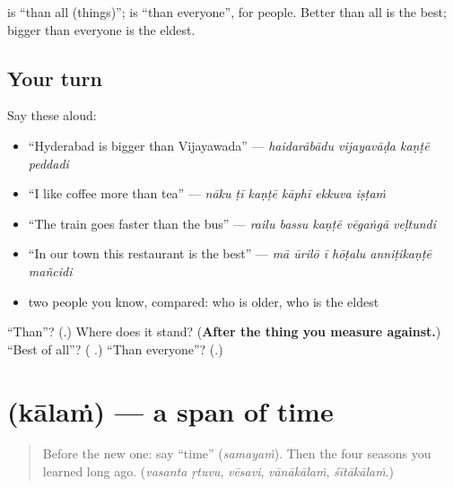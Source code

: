 \textbf{} is \textquotedblleft{}than all (things)\textquotedblright{}; \textbf{} is \textquotedblleft{}than everyone\textquotedblright{}, for people. Better than all is the best; bigger than everyone is the eldest.

\subsection*{Your turn}
Say these aloud:

\begin{itemize}
\raggedright
  \item \textquotedblleft{}Hyderabad is bigger than Vijayawada\textquotedblright{} — \emph{haidarābādu vijayavāḍa kaṇṭē peddadi}
  \item \textquotedblleft{}I like coffee more than tea\textquotedblright{} — \emph{nāku ṭī kaṇṭē kāphī ekkuva iṣṭaṁ}
  \item \textquotedblleft{}The train goes faster than the bus\textquotedblright{} — \emph{railu bassu kaṇṭē vēgaṅgā veḷtundi}
  \item \textquotedblleft{}In our town this restaurant is the best\textquotedblright{} — \emph{mā ūrilō ī hōṭalu anniṭikaṇṭē mañcidi}
  \item two people you know, compared: who is older, who is the eldest
\end{itemize}

\begin{tcolorbox}[breakable,colback=teal!4,colframe=teal!35!black,title={Before you move on}]
\textquotedblleft{}Than\textquotedblright{}? (\textbf{}.) Where does it stand? (\textbf{After the thing you measure against.}) \textquotedblleft{}Best of all\textquotedblright{}? (\textbf{ }.) \textquotedblleft{}Than everyone\textquotedblright{}? (\textbf{}.)
\end{tcolorbox}
\section[\texorpdfstring{\te{కాలం} (kālaṁ)}{కాలం (kālaṁ)}]{ (kālaṁ) — a span of time}

\label{lesson:TE-C323-kalam}



\begin{quote}
Before the new one: say \textquotedblleft{}time\textquotedblright{} (\emph{samayaṁ}). Then the four seasons you learned long ago. (\emph{vasanta ṛtuvu}, \emph{vēsavi}, \emph{vānākālaṁ}, \emph{śītākālaṁ}.)
\end{quote}

